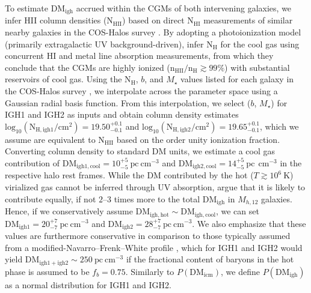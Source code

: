 \documentclass[twocolumn, linenumbers, tra]{aastex631}
\begin{document}
To estimate DM$_{\mathrm{igh}}$ accrued within the CGMs of both intervening galaxies, we infer HII column densities (N$_{\mathrm{HII}}$) based on direct N$_{\mathrm{HI}}$ measurements of similar nearby galaxies in the COS-Halos survey \cite[a study of 44 galaxy halos at $z \sim 0.2$ with cool $T \sim 10^{4}\ \mathrm{K}$ photoionized CGMs observed out to radii of $ \sim 160\ \mathrm{kpc}$;][]{Werk2014}. By adopting a photoionization model (primarily extragalactic UV background-driven), \citet{Werk2014} infer $\mathrm{N}_{\mathrm{H}}$ for the cool gas using concurrent HI and metal line absorption measurements, from which they conclude that the CGMs are highly ionized ($\mathrm{n}_{\mathrm{HII}} / \mathrm{n}_{\mathrm{H}} \gtrsim 99 \%$) with substantial reservoirs of cool gas. Using the N$_{\mathrm{H}}$, $b$, and $M_\star$ values listed for each galaxy in the COS-Halos survey \citep[see their Table 1;][]{Werk2014}, we interpolate across the parameter space using a Gaussian radial basis function. From this interpolation, we select ($b$, $M_\star$) for IGH1 and IGH2 as inputs and obtain column density estimates $\mathrm{log}_{10}(\mathrm{N}_{\mathrm{H}, \mathrm{igh1}}/\mathrm{cm}^{2}) = 19.50^{+0.1}_{-0.1}$ and $\mathrm{log}_{10}(\mathrm{N}_{\mathrm{H}, \mathrm{igh2}}/\mathrm{cm}^{2}) = 19.65^{+0.1}_{-0.1}$, which we assume are equivalent to N$_{\mathrm{HII}}$ based on the order unity ionization fraction. Converting column density to standard DM units, we estimate a cool gas contribution of $\mathrm{DM}_{\mathrm{igh1,cool}} = 10^{+5}_{-5}\ \mathrm{pc} \mathrm{\ cm}^{-3}$ and $\mathrm{DM}_{\mathrm{igh2,cool}} = 14^{+5}_{-5}\ \mathrm{pc}\ \mathrm{\ cm}^{-3}$ in the respective halo rest frames. While the DM contributed by the hot ($T \gtrsim 10^6\ \mathrm{K}$) virialized gas cannot be inferred through UV absorption, \citet{Prochaska2019a} argue that it is likely to contribute equally, if not $2$--$3$ times more to the total $\mathrm{DM}_{\mathrm{igh}}$ in $M_{h,12}$ galaxies. {Hence, if we conservatively assume $\mathrm{DM}_{\mathrm{igh,hot}} \sim \mathrm{DM}_{\mathrm{igh,cool}}$, we can set $\mathrm{DM}_{\mathrm{igh1}} = 20^{+7}_{-7}\ \mathrm{pc} \mathrm{\ cm}^{-3}$ and $\mathrm{DM}_{\mathrm{igh2}} = 28^{+7}_{-7}\ \mathrm{pc} \mathrm{\ cm}^{-3}$. We also emphasize that these values are furthermore conservative in comparison to those typically assumed from a modified-Navarro--Frenk--White profile \citep[see Eq.\,6 in][]{Prochaska2019a}, which for IGH1 and IGH2 would yield $\mathrm{DM}_{\mathrm{igh1+igh2}} \sim 250\ \mathrm{pc\ cm}^{-3}$ if the fractional content of baryons in the hot phase is assumed to be $f_b = 0.75$. Similarly to $P(\mathrm{DM}_{\mathrm{icm}})$, we define $P(\mathrm{DM}_{\mathrm{igh}})$ as a normal distribution for IGH1 and IGH2.}
\end{document}
